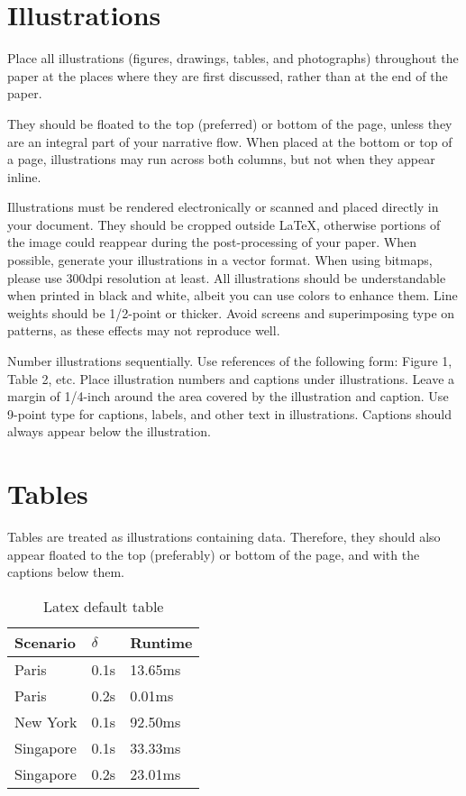 \documentclass{article}
\begin{document}
\section{Illustrations}

Place all illustrations (figures, drawings, tables, and photographs)
throughout the paper at the places where they are first discussed,
rather than at the end of the paper.

They should be floated to the top (preferred) or bottom of the page,
unless they are an integral part
of your narrative flow. When placed at the bottom or top of
a page, illustrations may run across both columns, but not when they
appear inline.

Illustrations must be rendered electronically or scanned and placed
directly in your document. They should be cropped outside \LaTeX{},
otherwise portions of the image could reappear during the post-processing of your paper.
When possible, generate your illustrations in a vector format.
When using bitmaps, please use 300dpi resolution at least.
All illustrations should be understandable when printed in black and
white, albeit you can use colors to enhance them. Line weights should
be 1/2-point or thicker. Avoid screens and superimposing type on
patterns, as these effects may not reproduce well.

Number illustrations sequentially. Use references of the following
form: Figure 1, Table 2, etc. Place illustration numbers and captions
under illustrations. Leave a margin of 1/4-inch around the area
covered by the illustration and caption.  Use 9-point type for
captions, labels, and other text in illustrations. Captions should always appear below the illustration.

\section{Tables}

Tables are treated as illustrations containing data. Therefore, they should also appear floated to the top (preferably) or bottom of the page, and with the captions below them.

\begin{table}
    \centering
    \begin{tabular}{lll}
        \hline
        Scenario  & $\delta$ & Runtime \\
        \hline
        Paris     & 0.1s     & 13.65ms \\
        Paris     & 0.2s     & 0.01ms  \\
        New York  & 0.1s     & 92.50ms \\
        Singapore & 0.1s     & 33.33ms \\
        Singapore & 0.2s     & 23.01ms \\
        \hline
    \end{tabular}
    \caption{Latex default table}
    \label{tab:plain}
\end{table}
\end{document}
